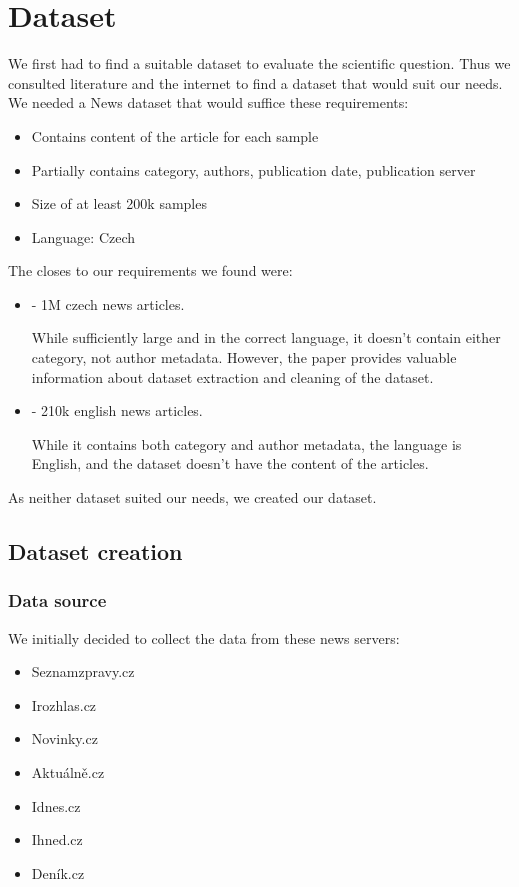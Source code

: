 \chapter{Dataset}
\label{chap:math}

We first had to find a suitable dataset to evaluate the scientific question.
Thus we consulted literature and the internet to find a dataset that would suit our needs.
 We needed a News dataset that would suffice these requirements:

\begin{itemize}
    \item Contains content of the article for each sample
    \item Partially contains category, authors, publication date, publication server
    \item Size of at least 200k samples
    \item Language: Czech
\end{itemize}


The closes to our requirements we found were:
\begin{itemize}
    \item \cite{strakaSumeCzechLargeCzech2018a} - 1M czech news articles.

        While sufficiently large and in the correct language, 
        it doesn't contain either category, not author metadata. 
        However, the paper provides valuable information about dataset extraction
        and cleaning of the dataset.
    \item \cite{misraNewsCategoryDataset2022} - 210k english news articles.

        While it contains both category and author metadata,
        the language is English, and the dataset doesn't have the content of the articles.
\end{itemize}

As neither dataset suited our needs, we created our dataset.


\section{Dataset creation}
\label{sec:dataset-creation}

\subsection{Data source}
We initially decided to collect the data from these news servers:
\begin{itemize}
    \item Seznamzpravy.cz
    \item Irozhlas.cz
    \item Novinky.cz
    \item Aktuálně.cz
    \item Idnes.cz
    \item Ihned.cz
    \item Deník.cz
\end{itemize}

